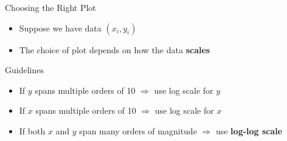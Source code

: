\documentclass[10pt]{beamer}
\begin{document}








\begin{frame}{Choosing the Right Plot}

\begin{itemize}
\item Suppose we have data $(x_i, y_i)$

\item The choice of plot depends on how the data \textbf{scales}
\end{itemize}

\vspace{3mm}

\begin{block}{Guidelines}
\begin{itemize}
\item If $y$ spans multiple orders of 10
$\Rightarrow$ use log scale for $y$

\vspace{2mm}

\item If $x$ spans multiple orders of 10
$\Rightarrow$ use log scale for $x$

\vspace{2mm}

\item If both $x$ and $y$ span many orders of magnitude 
$\Rightarrow$ use \textbf{log-log scale}
\end{itemize}
\end{block}

\vspace{3mm}


\end{frame}
\end{document}
